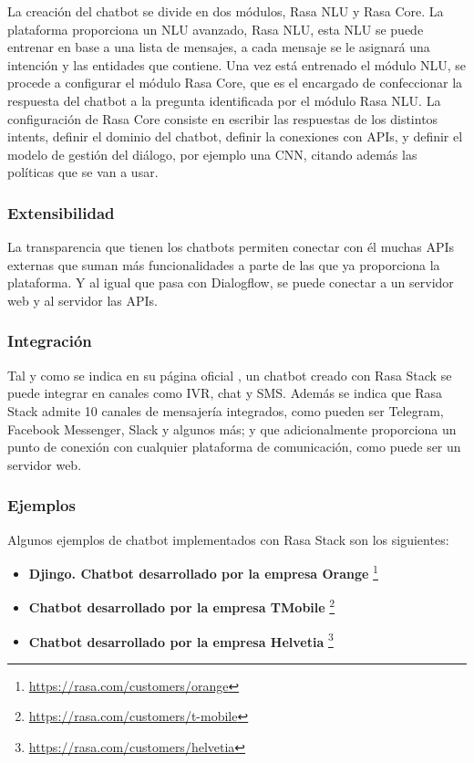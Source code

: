 La creación del chatbot se divide en dos módulos, Rasa NLU y Rasa Core. La plataforma proporciona un NLU avanzado, Rasa NLU, esta NLU se puede entrenar en base a una lista de mensajes, a cada mensaje se le asignará una intención y las entidades que contiene. Una vez está entrenado el módulo NLU, se procede a configurar el módulo Rasa Core, que es el encargado de confeccionar la respuesta del chatbot a la pregunta identificada por el módulo Rasa NLU. La configuración de Rasa Core consiste en escribir las respuestas de los distintos intents, definir el dominio del chatbot, definir la conexiones con APIs, y definir el modelo de gestión del diálogo, por ejemplo una CNN, citando además las políticas que se van a usar.

\subsubsection*{Extensibilidad}

La transparencia que tienen los chatbots permiten conectar con él muchas APIs externas que suman más funcionalidades a parte de las que ya proporciona la plataforma. Y al igual que pasa con Dialogflow, se puede conectar a un servidor web y al servidor las APIs.

\subsubsection*{Integración}

Tal y como se indica en su página oficial \cite{RefWorks:RefID:20-2020rasa}, un chatbot creado con Rasa Stack se puede integrar en canales como IVR, chat y SMS. Además se indica que Rasa Stack admite 10 canales de mensajería integrados, como pueden ser Telegram, Facebook Messenger, Slack y algunos más; y que adicionalmente proporciona un punto de conexión con cualquier plataforma de comunicación, como puede ser un servidor web.

\subsubsection*{Ejemplos}

Algunos ejemplos de chatbot implementados con Rasa Stack son los siguientes:

\begin{itemize}
    \item \textbf{Djingo. Chatbot desarrollado por la empresa Orange} \footnote{\url{https://rasa.com/customers/orange}}
    \item \textbf{Chatbot desarrollado por la empresa TMobile} \footnote{\url{https://rasa.com/customers/t-mobile}}
    \item \textbf{Chatbot desarrollado por la empresa Helvetia} \footnote{\url{https://rasa.com/customers/helvetia}}
\end{itemize}



